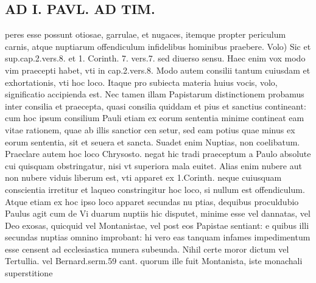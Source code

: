 \documentclass{article}
\begin{document}
\begin{pages}
\section*{AD I. PAVL. AD TIM. }
\marginpar{[ p.190 ]}\pstart peres esse possunt otiosae, garrulae, et nugaces, itemque propter periculum carnis, atque nuptiarum offendiculum infidelibus hominibus praebere. Volo) Sic et sup.cap.2.vers.8. et 1. Corinth. 7. vers.7. sed diuerso sensu. Haec enim vox modo vim praecepti habet, vti in cap.2.vers.8. Modo autem consilii tantum cuiusdam et exhortationis, vti hoc loco. Itaque pro subiecta materia huius vocis, volo, significatio accipienda est. Nec tamen illam Papistarum distinctionem probamus inter consilia et praecepta, quasi consilia quiddam et pius et sanctius contineant: cum hoc ipsum consilium Pauli etiam ex eorum sententia minime contineat eam vitae rationem, quae ab illis sanctior cen setur, sed eam potius quae minus ex eorum sententia, sit et seuera et sancta. Suadet enim Nuptias, non coelibatum. Praeclare autem hoc loco Chrysosto. negat hic tradi praeceptum a Paulo absolute cui quisquam obstringatur, nisi vt superiora mala euitet. Alias enim nubere aut non nubere viduis liberum est, vti apparet ex 1.Corinth. neque cuiusquam conscientia irretitur et laqueo constringitur hoc loco, si nullum est offendiculum. Atque etiam ex hoc ipso loco apparet secundas nu ptias, dequibus proculdubio Paulus agit cum de Vi duarum nuptiis hic disputet, minime esse vel dannatas, vel Deo exosas, quicquid vel Montanistae, vel post eos Papistae sentiant: e quibus illi secundas nuptias omnino improbant: hi vero eas tanquam infames impedimentum esse censent ad ecclesiastica munera subeunda. Nihil certe moror dictum vel Tertullia. vel Bernard.serm.59 cant. quorum ille fuit Montanista, iste monachali superstitione  \pend

\end{pages}
\end{document}
